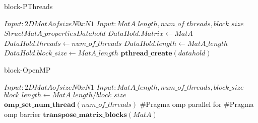 \documentclass[conference]{IEEEtran}
\begin{document}
\begin{algorithm}
\caption{block-PThreads}
\SetAlgoLined
\DontPrintSemicolon
\state $ Input: 2D MatA of size N0 x N1$\;
       $ Input: MatA\_length, num\_of\_threads, block\_size$\;
       $ Struct MatA\_properties Datahold$\;
       $ DataHold.Matrix \gets MatA$\;
       $ DataHold.threads \gets num\_of\_threads$\;
       $ DataHold.length \gets MatA\_length$\;
        $ DataHold.block\_size \gets MatA\_length$\;
       $ \textbf{pthread\_create}(datahold)$\;
\end{algorithm}

\begin{algorithm}
\caption{block-OpenMP}
\SetAlgoLined
\DontPrintSemicolon
\state $ Input: 2D MatA of size N0 x N1$\;
       $ Input: MatA\_length, num\_of\_threads, block\_size$\;
       $block\_length \gets MatA\_length/block\_size$\;
       $ \textbf{omp\_set\_num\_thread}(num\_of\_threads)$\;
        #Pragma omp parallel for\;
          #Pragma omp barrier\;
         $ \textbf{transpose\_matrix\_blocks}(MatA)$\;
\end{algorithm}
\end{document}
